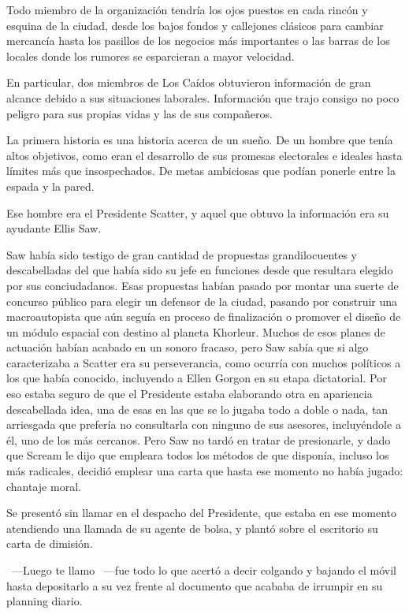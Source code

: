 Todo miembro de la organización tendría los ojos puestos en cada rincón y esquina de la ciudad, desde los bajos fondos y callejones clásicos para cambiar mercancía hasta los pasillos de los negocios más importantes o las barras de los locales donde los rumores se esparcieran a mayor velocidad.

En particular, dos miembros de Los Caídos obtuvieron información de gran alcance debido a sus situaciones laborales. Información que trajo consigo no poco peligro para sus propias vidas y las de sus compañeros.

\parbreak
La primera historia es una historia acerca de un sueño. De un hombre que tenía altos objetivos, como eran el desarrollo de sus promesas electorales e ideales hasta límites más que insospechados. De metas ambiciosas que podían ponerle entre la espada y la pared.

Ese hombre era el Presidente Scatter, y aquel que obtuvo la información era su ayudante Ellis Saw.

Saw había sido testigo de gran cantidad de propuestas grandilocuentes y descabelladas del que había sido su jefe en funciones desde que resultara elegido por sus conciudadanos. Esas propuestas habían pasado por montar una suerte de concurso público para elegir un defensor de la ciudad, pasando por construir una macroautopista que aún seguía en proceso de finalización o promover el diseño de un módulo espacial con destino al planeta Khorleur. Muchos de esos planes de actuación habían acabado en un sonoro fracaso, pero Saw sabía que si algo caracterizaba a Scatter era su perseverancia, como ocurría con muchos políticos a los que había conocido, incluyendo a Ellen Gorgon en su etapa dictatorial. Por eso estaba seguro de que el Presidente estaba elaborando otra en apariencia descabellada idea, una de esas en las que se lo jugaba todo a doble o nada, tan arriesgada que prefería no consultarla con ninguno de sus asesores, incluyéndole a él, uno de los más cercanos. Pero Saw no tardó en tratar de presionarle, y dado que Scream le dijo que empleara todos los métodos de que disponía, incluso los más radicales, decidió emplear una carta que hasta ese momento no había jugado: chantaje moral.

Se presentó sin llamar en el despacho del Presidente, que estaba en ese momento atendiendo una llamada de su agente de bolsa, y plantó sobre el escritorio su carta de dimisión.

~---Luego te llamo ~---fue todo lo que acertó a decir colgando y bajando el móvil hasta depositarlo a su vez frente al documento que acababa de irrumpir en su planning diario.

